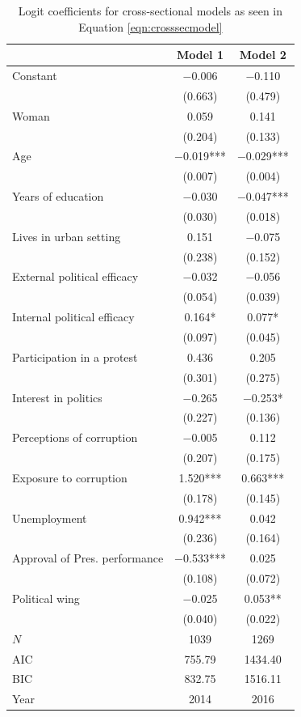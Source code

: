 \documentclass[12pt,a4]{article}\usepackage[]{graphicx}\usepackage[]{xcolor}
\begin{document}
\begin{table}[htbp]
\begin{center}
\caption{Logit coefficients for cross-sectional models as seen in Equation \ref{eqn:crosssecmodel}}
\label{tab:crossmod}

\begin{tabular}[t]{lcc}
\toprule
  & Model 1 & Model 2\\
\midrule
Constant & \num{-0.006} & \num{-0.110}\\
 & (\num{0.663}) & (\num{0.479})\\
Woman & \num{0.059} & \num{0.141}\\
 & (\num{0.204}) & (\num{0.133})\\
Age & \num{-0.019}*** & \num{-0.029}***\\
 & (\num{0.007}) & (\num{0.004})\\
Years of education & \num{-0.030} & \num{-0.047}***\\
 & (\num{0.030}) & (\num{0.018})\\
Lives in urban setting & \num{0.151} & \num{-0.075}\\
 & (\num{0.238}) & (\num{0.152})\\
External political efficacy & \num{-0.032} & \num{-0.056}\\
 & (\num{0.054}) & (\num{0.039})\\
Internal political efficacy & \num{0.164}* & \num{0.077}*\\
 & (\num{0.097}) & (\num{0.045})\\
Participation in a protest & \num{0.436} & \num{0.205}\\
 & (\num{0.301}) & (\num{0.275})\\
Interest in politics & \num{-0.265} & \num{-0.253}*\\
 & (\num{0.227}) & (\num{0.136})\\
Perceptions of corruption & \num{-0.005} & \num{0.112}\\
 & (\num{0.207}) & (\num{0.175})\\
Exposure to corruption & \num{1.520}*** & \num{0.663}***\\
 & (\num{0.178}) & (\num{0.145})\\
Unemployment & \num{0.942}*** & \num{0.042}\\
 & (\num{0.236}) & (\num{0.164})\\
Approval of Pres. performance & \num{-0.533}*** & \num{0.025}\\
 & (\num{0.108}) & (\num{0.072})\\
Political wing & \num{-0.025} & \num{0.053}**\\
 & (\num{0.040}) & (\num{0.022})\\
\midrule
$N$ & \num{1039} & \num{1269}\\
AIC & \num{755.79} & \num{1434.40}\\
BIC & \num{832.75} & \num{1516.11}\\
Year & 2014 & 2016\\
\bottomrule
\end{tabular}



\end{center}
\end{table}
\end{document}
